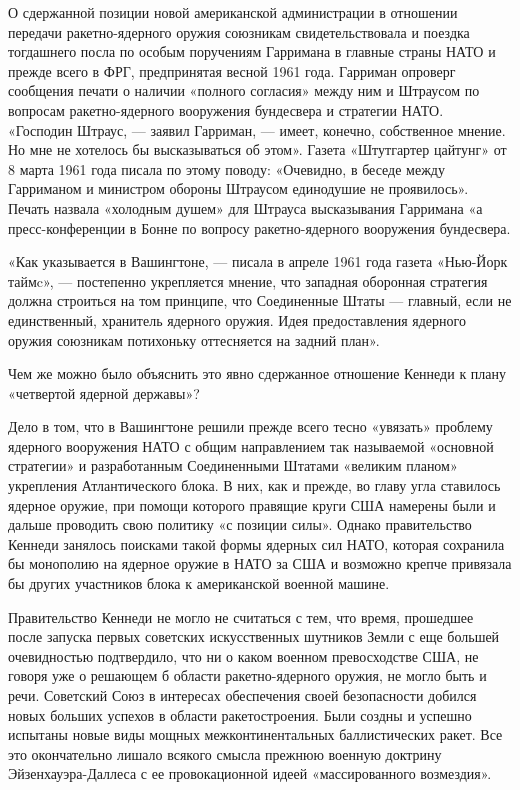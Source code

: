 \documentclass[12pt, a4paper, openany]{book}
\begin{document}
	О сдержанной позиции новой американской администрации в отношении передачи ракетно-ядерного оружия союзникам свидетельствовала и поездка тогдашнего посла по особым поручениям Гарримана в главные страны НАТО и прежде всего в ФРГ, предпринятая весной 1961 года. Гарриман опроверг сообщения печати о наличии «полного согласия» между ним и Штраусом по вопросам ракетно-ядерного вооружения бундесвера и стратегии НАТО. «Господин Штраус, — заявил Гарриман, — имеет, конечно, собственное мнение. Но мне не хотелось бы высказываться об этом». Газета «Штутгартер цайтунг» от 8 марта 1961 года писала по этому поводу: «Очевидно, в беседе между Гарриманом и министром обороны Штраусом единодушие не проявилось». Печать назвала «холодным душем» для Штрауса высказывания Гарримана «а пресс-конференции в Бонне по вопросу ракетно-ядерного вооружения бундесвера.
	
	«Как указывается в Вашингтоне, — писала в апреле 1961 года газета «Нью-Йорк таймc», — постепенно укрепляется мнение, что западная оборонная стратегия должна строиться на том принципе, что Соединенные Штаты — главный, если не единственный, хранитель ядерного оружия. Идея предоставления ядерного оружия союзникам потихоньку оттесняется на задний план».
	
	Чем же можно было объяснить это явно сдержанное отношение Кеннеди к плану «четвертой ядерной державы»?
	
	Дело в том, что в Вашингтоне решили прежде всего тесно «увязать» проблему ядерного вооружения НАТО с общим направлением так называемой «основной стратегии» и разработанным Соединенными Штатами «великим планом» укрепления Атлантического блока. В них, как и прежде, во главу угла ставилось ядерное оружие, при помощи которого правящие круги США намерены были и дальше проводить свою политику «с позиции силы». Однако правительство Кеннеди занялось поисками такой формы ядерных сил НАТО, которая сохранила бы монополию на ядерное оружие в НАТО за США и возможно крепче привязала бы других участников блока к американской военной машине.
	
	Правительство Кеннеди не могло не считаться с тем, что время, прошедшее после запуска первых советских искусственных шутников Земли с еще большей очевидностью подтвердило, что ни о каком военном превосходстве США, не говоря уже о решающем б области ракетно-ядерного оружия, не могло быть и речи. Советский Союз в интересах обеспечения своей безопасности добился новых больших успехов в области ракетостроения. Были создны и успешно испытаны новые виды мощных межконтинентальных баллистических ракет. Все это окончательно лишало всякого смысла прежнюю военную доктрину Эйзенхауэра-Даллеса с ее провокационной идеей «массированного возмездия».
	
\end{document}

